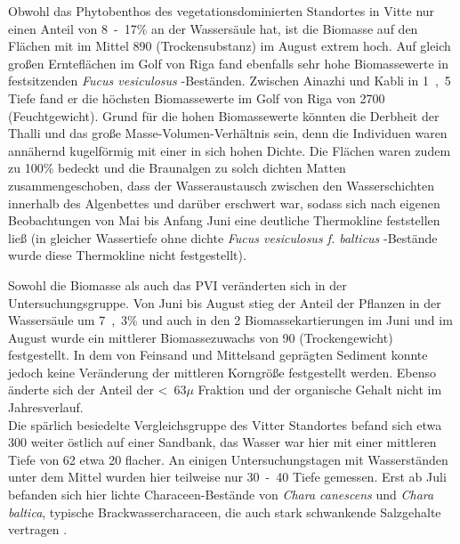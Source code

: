 Obwohl das Phytobenthos des vegetationsdominierten Standortes in Vitte nur einen Anteil von \unit{8-17}{\%} an der Wassersäule hat, ist die Biomasse auf den Flächen mit im Mittel \unit{890}{\gram\per\metre\suqared} (Trockensubstanz) im August extrem hoch. Auf gleich großen Ernteflächen im Golf von Riga fand \cite{martin_1999} ebenfalls sehr hohe Biomassewerte in festsitzenden \textit{Fucus vesiculosus} -Beständen. Zwischen Ainazhi und Kabli in \unit{1,5}{\metre} Tiefe fand er die höchsten Biomassewerte im Golf von Riga von \unit{2700}{\gram\per\metre\suqared} (Feuchtgewicht). Grund für die hohen Biomassewerte könnten die Derbheit der Thalli und das große Masse-Volumen-Verhältnis sein, denn die Individuen waren annähernd kugelförmig mit einer in sich hohen Dichte. Die Flächen waren zudem zu \unit{100}{\%} bedeckt und die Braunalgen zu solch dichten Matten zusammengeschoben, dass  der Wasseraustausch zwischen den Wasserschichten innerhalb des Algenbettes und darüber erschwert war, sodass sich nach eigenen Beobachtungen von Mai bis Anfang Juni eine deutliche Thermokline feststellen ließ (in gleicher Wassertiefe ohne dichte \textit{Fucus vesiculosus f. balticus} -Bestände wurde diese Thermokline nicht festgestellt). 

Sowohl die Biomasse als auch das PVI veränderten sich in der Untersuchungsgruppe. Von Juni bis August stieg der Anteil der Pflanzen in der Wassersäule um \unit{7,3}{\%} und auch in den 2 Biomassekartierungen im Juni und im August wurde ein mittlerer Biomassezuwachs von \unit{90}{\gram\per\metre\squared} (Trockengewicht) festgestellt. 
In dem von Feinsand und Mittelsand geprägten Sediment konnte jedoch keine Veränderung der mittleren Korngröße festgestellt werden. Ebenso änderte sich der Anteil der \unit{<63}{$\mu$\metre} Fraktion und der organische Gehalt nicht im Jahresverlauf. 
\\
Die spärlich besiedelte Vergleichsgruppe des Vitter Standortes befand sich etwa \unit{300}{\metre} weiter östlich auf einer Sandbank, das Wasser war hier mit einer mittleren Tiefe von \unit{62}{\centi\metre} etwa \unit{20}{\centi\metre} flacher. An einigen Untersuchungstagen mit Wasserständen unter dem Mittel wurden hier teilweise nur \unit{30-40}{\centi\metre} Tiefe gemessen. Erst ab Juli befanden sich hier lichte Characeen-Bestände von \textit{Chara canescens} und \textit{Chara baltica}, typische Brackwassercharaceen, die auch stark schwankende Salzgehalte vertragen \citep{blindow_2003, blumel_2003}. 

